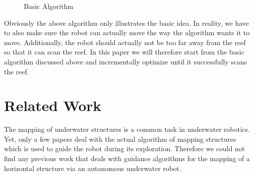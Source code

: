 \documentclass[twoside, 12pt]{article}
\begin{document}
\begin{figure}
\vspace{-26pt}
  \begin{center}
  \end{center}
\vspace{-20pt}
  \caption{Basic Algorithm}
  \label{fig:basicAlgorithm}
\end{figure}

\begin{figure}
\vspace{-50pt}
\end{figure}

Obviously the above algorithm only illustrates the basic idea. In reality, we have to also make sure the robot can actually move the way the algorithm wants it to move. Additionally, the robot should actually not be too far away from the reef so that it can scan the reef. In this paper we will therefore start from the basic algorithm discussed above and incrementally optimize until it successfully scans the reef. \\

\section{Related Work}
\label{sec:relatedworks}

The mapping of underwater structures is a common task in underwater robotics. Yet, only a few papers deal with the actual algorithm of mapping structures which is used to guide the robot during its exploration. Therefore we could not find any previous work that deals with guidance algorithms for the mapping of a horizontal structure via an autonomous underwater robot.\\
\end{document}
